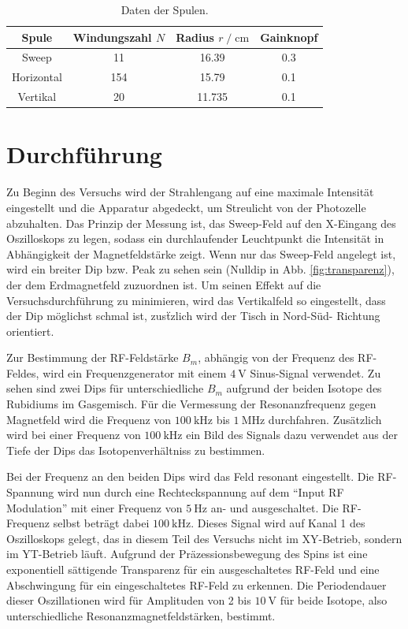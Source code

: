 \begin{table}
  \centering
  \caption{Daten der Spulen.}
  \label{tab:spulen}
  \begin{tabular}{c | S[table-format=3.0] S[table-format=2.3] S[table-format=1.1]}
    \toprule
    {Spule} & {Windungszahl $N$} & {Radius $r\;/\;\si{\centi\meter}$} & {Gainknopf} \\
    \midrule
    Sweep      &  11 & 16.39  & 0.3 \\
    Horizontal & 154 & 15.79  & 0.1 \\
    Vertikal   &  20 & 11.735 & 0.1 \\
    \bottomrule
  \end{tabular}
\end{table}
\section{Durchführung}

Zu Beginn des Versuchs wird der Strahlengang auf eine maximale Intensität eingestellt und die Apparatur abgedeckt,
um Streulicht von der Photozelle abzuhalten.
Das Prinzip der Messung ist, das Sweep-Feld auf den X-Eingang des Oszilloskops zu legen, sodass ein durchlaufender
Leuchtpunkt die Intensität in Abhängigkeit der Magnetfeldstärke zeigt.
Wenn nur das Sweep-Feld angelegt ist, wird ein breiter Dip bzw. Peak zu sehen sein (Nulldip in Abb.
\ref{fig:transparenz}), der dem Erdmagnetfeld zuzuordnen ist. Um seinen Effekt auf die Versuchsdurchführung zu
minimieren, wird das Vertikalfeld so eingestellt, dass der Dip möglichst schmal ist,
zusẗzlich wird der Tisch in Nord-Süd- Richtung orientiert.

Zur Bestimmung der RF-Feldstärke $B_m$, abhängig von der Frequenz des RF-Feldes, wird ein Frequenzgenerator mit
einem $\SI{4}{\volt}$ Sinus-Signal verwendet. Zu sehen sind zwei Dips für unterschiedliche $B_m$ aufgrund der
beiden Isotope des Rubidiums im Gasgemisch.
Für die Vermessung der Resonanzfrequenz gegen Magnetfeld wird die Frequenz von $\SI{100}{\kilo\hertz}$
bis $\SI{1}{\mega\hertz}$ durchfahren.
Zusätzlich wird bei einer Frequenz von $\SI{100}{\kilo\hertz}$ ein Bild des Signals dazu verwendet aus der
Tiefe der Dips das Isotopenverhältniss zu bestimmen.

Bei der Frequenz an den beiden Dips wird das Feld resonant eingestellt. Die RF-Spannung wird nun durch eine
Rechteckspannung auf dem \enquote{Input RF Modulation} mit einer Frequenz von $\SI{5}{\hertz}$ an- und ausgeschaltet.
Die RF-Frequenz selbst beträgt dabei $\SI{100}{\kilo\hertz}$. Dieses Signal wird auf Kanal 1 des Oszilloskops
gelegt, das in diesem Teil des Versuchs nicht im XY-Betrieb, sondern im YT-Betrieb läuft.
Aufgrund der Präzessionsbewegung des Spins ist eine exponentiell sättigende Transparenz für ein ausgeschaltetes
RF-Feld und eine Abschwingung für ein eingeschaltetes RF-Feld zu erkennen. Die Periodendauer dieser Oszillationen
wird für Amplituden von 2 bis $\SI{10}{\volt}$ für beide Isotope, also unterschiedliche Resonanzmagnetfeldstärken,
bestimmt.
